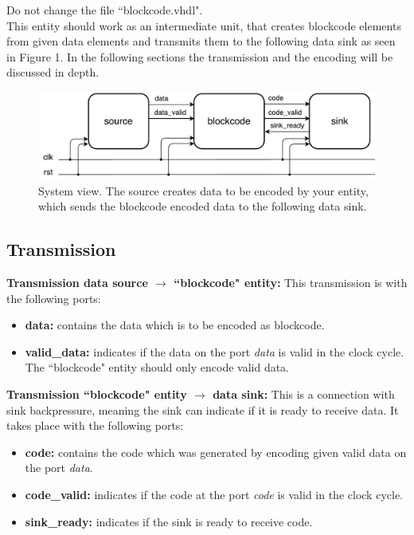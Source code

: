 \documentclass[a4paper,12pt]{article}
\begin{document}
Do not change the file ``blockcode.vhdl".\\

This entity should work as an intermediate unit, that creates blockcode elements from given data elements and transmits
them to the following data sink as seen in Figure 1. In the following sections the transmission and the encoding will
be discussed in depth.
\\

\begin{figure}[h!]
\centering
\includegraphics[scale=0.6]{../static/system_view.pdf}
\caption{System view. The source creates data to be encoded by your entity, which sends the blockcode encoded data to
the following data sink.}
\end{figure}

\newpage
\subsection*{\noindent Transmission}

\textbf{Transmission data source $\rightarrow$ ``blockcode" entity:} This transmission is with the following ports:
\begin{itemize}
\item \textbf{data:} contains the data which is to be encoded as blockcode.
\item \textbf{valid\_data:} indicates if the data on the port \textit{data} is valid in the clock cycle.
The ``blockcode" entity should only encode valid data.
\end{itemize}

\textbf{Transmission ``blockcode" entity $\rightarrow$ data sink:} This is a connection with sink backpressure,
meaning the sink can indicate if it is ready to receive data. It takes place with the following ports:
\begin{itemize}
\item \textbf{code:} contains the code which was generated by encoding given valid data on the port \textit{data}.
\item \textbf{code\_valid:} indicates if the code at the port \textit{code} is valid in the clock cycle.
\item \textbf{sink\_ready:} indicates if the sink is ready to receive code.
\end{itemize}
\end{document}
